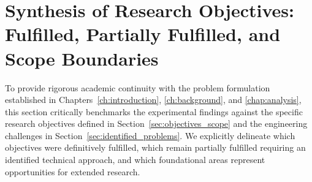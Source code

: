 \documentclass[target=mst,aauheader=aics,style=]{thud}
\begin{document}
\section{Synthesis of Research Objectives: Fulfilled, Partially Fulfilled, and Scope Boundaries}
\label{sec:objectives_synthesis}

To provide rigorous academic continuity with the problem formulation established in Chapters~\ref{ch:introduction}, \ref{ch:background}, and \ref{chap:analysis}, this section critically benchmarks the experimental findings against the specific research objectives defined in Section~\ref{sec:objectives_scope} and the engineering challenges in Section~\ref{sec:identified_problems}. We explicitly delineate which objectives were definitively fulfilled, which remain partially fulfilled requiring an identified technical approach, and which foundational areas represent opportunities for extended research.
\end{document}
